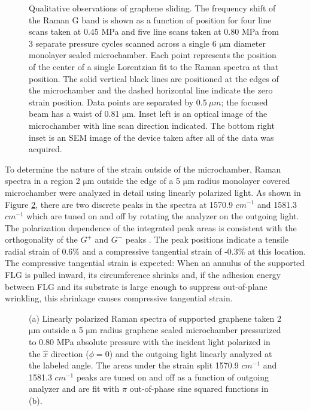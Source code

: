 \begin{figure}
	\begin{center}
	
	\end{center}
	\caption[Qualitative observations of graphene sliding]{\label{fig:fri:qualresults}
	Qualitative observations of graphene sliding.
	The frequency shift of the Raman G band is shown as a function of position for four line scans taken at 0.45 MPa and five line scans taken at 0.80 MPa from 3 separate pressure cycles scanned across a single 6 $\mathrm{\mu}$m diameter monolayer sealed microchamber.
	Each point represents the position of the center of a single Lorentzian fit to the Raman spectra at that position.
	The solid vertical black lines are positioned at the edges of the microchamber and the dashed horizontal line indicate the zero strain position.
	Data points are separated by $0.5 \ \mu m$; the focused beam has a waist of 0.81 $\mathrm{\mu}$m.
	Inset left is an optical image of the microchamber with line scan direction indicated.
	The bottom right inset is an SEM image of the device taken after all of the data was acquired.}
\end{figure}

To determine the nature of the strain outside of the microchamber, Raman spectra in a region 2 $\mathrm{\mu}$m outside the edge of a 5 $\mathrm{\mu}$m radius monolayer covered microchamber were analyzed in detail using linearly polarized light.
As shown in Figure \ref{fig:fri:qualout}, there are two discrete peaks in the spectra at 1570.9 $cm^{-1}$ and 1581.3 $cm^{-1}$ which are tuned on and off by rotating the analyzer on the outgoing light.
The polarization dependence of the integrated peak areas is consistent with the orthogonality of the $G^+$ and $G^-$ peaks \cite{Huang2009}.
The peak positions indicate a tensile radial strain of 0.6\% and a compressive tangential strain of -0.3\% at this location.
The compressive tangential strain is expected: When an annulus of the supported FLG is pulled inward, its circumference shrinks and, if the adhesion energy between FLG and its substrate is large enough to suppress out-of-plane wrinkling, this shrinkage causes compressive tangential strain.

\begin{figure}
	\begin{center}
	
	\end{center}
	\caption[Discrimination of strain split Raman modes using linearly polarized light]{\label{fig:fri:qualout}
	(a) Linearly polarized Raman spectra of supported graphene taken 2 $\mathrm{\mu}$m outside a 5 $\mathrm{\mu}$m radius graphene sealed microchamber pressurized to 0.80 MPa absolute pressure with the incident light polarized in the $\hat x$ direction ($\phi=0$) and the outgoing light linearly analyzed at the labeled angle.
	The areas under the strain split 1570.9 $cm^{-1}$ and 1581.3 $cm^{-1}$ peaks are tuned on and off as a function of outgoing analyzer and are fit with $\pi$ out-of-phase sine squared functions in (b).}
\end{figure}

